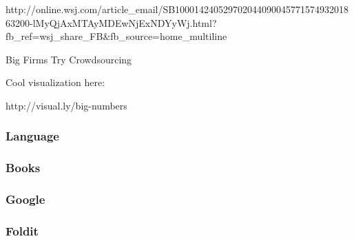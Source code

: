 

http://online.wsj.com/article_email/SB10001424052970204409004577157493201863200-lMyQjAxMTAyMDEwNjExNDYyWj.html?fb_ref=wsj_share_FB&fb_source=home_multiline

Big Firms Try Crowdsourcing

Cool visualization here:

http://visual.ly/big-numbers

\begin{frame}
  \frametitle{Language}
  
\end{frame}

\begin{frame}
  \frametitle{Books}
  
\end{frame}

\begin{frame}
  \frametitle{Google}
  
\end{frame}

\begin{frame}
  \frametitle{Foldit}
  
\end{frame}

